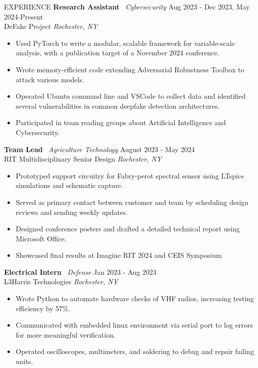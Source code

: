 \documentclass{resume} %
\begin{document}
\begin{rSection}{EXPERIENCE}
\textbf{Research Assistant} \textbar\ \textit{Cybersecurity} \hfill Aug 2023 - Dec 2023, May 2024-Present\\
DeFake Project \hfill \textit{Rochester, NY}
\begin{itemize}
\itemsep-3pt {}
    \item Used PyTorch to write a modular, scalable framework for variable-scale analysis, with a publication target of a November 2024 conference.
    \item Wrote memory-efficient code extending Adversarial Robustness Toolbox to attack various models.
    \item Operated Ubuntu command line and VSCode to collect data and identified several vulnerabilities in common deepfake detection architectures.
    \item Participated in team reading groups about Artificial Intelligence and Cybersecurity.
\end{itemize}

\textbf{Team Lead} \textbar\ \textit{Agriculture Technology} \hfill August 2023 - May 2024\\
RIT Multidisciplinary Senior Design \hfill \textit{Rochester, NY}
\begin{itemize}
\itemsep-3pt {}
    \item Prototyped support circuitry for Fabry-perot spectral sensor using LTspice simulations and schematic capture.
    \item Served as primary contact between customer and team by scheduling design reviews and sending weekly updates.
    \item Designed conference posters and drafted a detailed technical report using Microsoft Office.
    \item Showcased final results at Imagine RIT 2024 and CEIS Symposium
\end{itemize}

\textbf{Electrical Intern} \textbar\ \textit{Defense} \hfill Jan 2023 - Aug 2023\\
L3Harris Technologies \hfill \textit{Rochester, NY}
\begin{itemize}
\itemsep-3pt {}
    \item Wrote Python to automate hardware checks of VHF radios, increasing testing efficiency by 57\%.
    \item Communicated with embedded linux environment via serial port to log errors for more meaningful verification.
    \item Operated oscilloscopes, multimeters, and soldering to debug and repair failing units.
\end{itemize}


\end{rSection}
\end{document}
